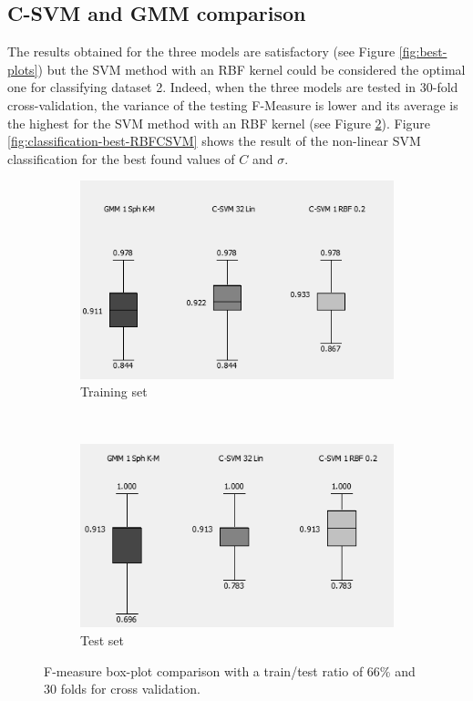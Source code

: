 \documentclass[a4paper,10pt]{article}
\begin{document}
\subsection{C-SVM and GMM comparison}

The results obtained for the three models are satisfactory (see Figure \ref{fig:best-plots}) but the SVM method with an RBF kernel could be considered the optimal one for classifying dataset 2. Indeed, when the three models are tested in 30-fold cross-validation, the variance of the testing F-Measure is lower and its average is the highest for the SVM method with an RBF kernel (see Figure \ref{fig:Compare-best-classification-training}). Figure \ref{fig:classification-best-RBFCSVM} shows the result of the non-linear SVM classification for the best found values of $C$ and $\sigma$. 


\begin{figure}[H]
\centering
	\begin{subfigure}[t]{0.3\textwidth} 
      \centering
      \includegraphics[height=3.2 cm]{pictures/Compare-best-classification-training}
      \caption{Training set}
      \label{fig:Compare-best-classification-training}
    \end{subfigure}%
    ~
    \begin{subfigure}[t]{0.3\textwidth} 
      \centering
      \includegraphics[height=3.2 cm]{pictures/Compare-best-classification-test}
      \caption{Test set}
      \label{fig:Compare-best-classification-training}
     \end{subfigure}
     \caption{F-measure box-plot comparison with a train/test ratio of 66\% and 30 folds for cross validation.}
     \label{fig:F-Measure-boxes}
\end{figure}
\end{document}
